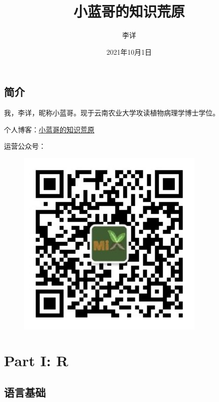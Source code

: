 \documentclass[
  10pt,
]{book}
\title{小蓝哥的知识荒原}
\author{李详}
\date{2021年10月1日}
\begin{document}
\maketitle

{
\hypersetup{linkcolor=}
\setcounter{tocdepth}{1}
\tableofcontents
}
\listoftables
\listoffigures
\hypertarget{ux7b80ux4ecb}{%
\chapter*{简介}\label{ux7b80ux4ecb}}

我，李详，昵称小蓝哥。现于云南农业大学攻读植物病理学博士学位。

个人博客：\href{https://www.web4xiang.com/}{小蓝哥的知识荒原}

运营公众号：

\begin{figure}

{\centering \includegraphics[width=3.58in]{figures/PLANTOMIX/PLANTOMIX} 

}

\end{figure}

\hypertarget{part-part-i-r}{%
\part*{Part I: R}\label{part-part-i-r}}

\hypertarget{r-base}{%
\chapter{语言基础}\label{r-base}}
\end{document}
